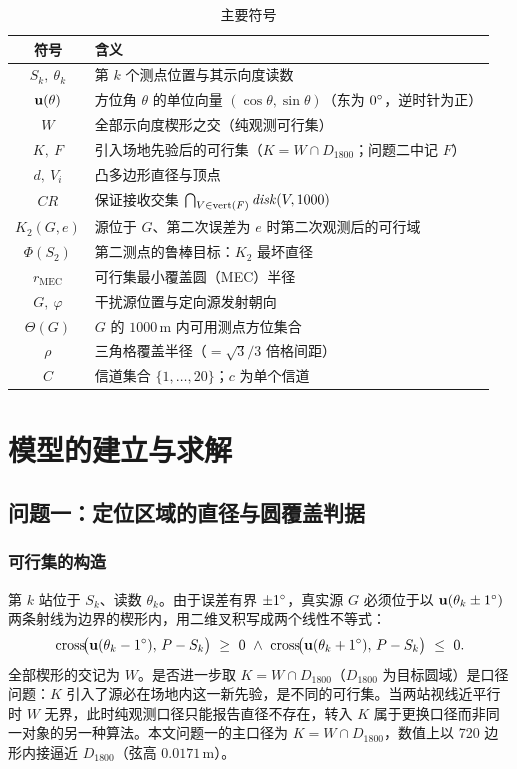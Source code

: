 \documentclass[12pt,a4paper]{ctexart}
\begin{document}
\begin{table}[H]
  \centering
  \caption{主要符号}
  \label{tab:symbols}
  \begin{tabular}{cl}
    \toprule
    \textbf{符号} & \textbf{含义} \\
    \midrule
    $S_k,\ \theta_k$ & 第 $k$ 个测点位置与其示向度读数 \\
    $\mathbf{u}(\theta)$ & 方位角 $\theta$ 的单位向量 $(\cos\theta,\sin\theta)$（东为 $0^{\circ}$，逆时针为正） \\
    $W$ & 全部示向度楔形之交（纯观测可行集） \\
    $K,\ F$ & 引入场地先验后的可行集（$K=W\cap D_{1800}$；问题二中记 $F$） \\
    $d,\ V_i$ & 凸多边形直径与顶点 \\
    $CR$ & 保证接收交集 $\bigcap_{V\in\operatorname{vert}(F)}\mathit{disk}(V,1000)$ \\
    $K_2(G,e)$ & 源位于 $G$、第二次误差为 $e$ 时第二次观测后的可行域 \\
    $\Phi(S_2)$ & 第二测点的鲁棒目标：$K_2$ 最坏直径 \\
    $r_{\mathrm{MEC}}$ & 可行集最小覆盖圆（MEC）半径 \\
    $G,\ \varphi$ & 干扰源位置与定向源发射朝向 \\
    $\Theta(G)$ & $G$ 的 $1000\,$m 内可用测点方位集合 \\
    $\rho$ & 三角格覆盖半径（$=\sqrt{3}/3$ 倍格间距） \\
    $C$ & 信道集合 $\{1,\dots,20\}$；$c$ 为单个信道 \\
    \bottomrule
  \end{tabular}
\end{table}

\section{模型的建立与求解}

\subsection{问题一：定位区域的直径与圆覆盖判据}

\subsubsection{可行集的构造}

第 $k$ 站位于 $S_k$、读数 $\theta_k$。由于误差有界 $\pm 1^{\circ}$，真实源 $G$ 必须位于以 $\mathbf{u}(\theta_k\pm 1^{\circ})$ 两条射线为边界的楔形内，用二维叉积写成两个线性不等式：
\begin{equation}
  \cross\!\bigl(\vect{u}(\theta_k-1\degr),\,P-S_k\bigr)\ \ge\ 0
  \ \wedge\
  \cross\!\bigl(\vect{u}(\theta_k+1\degr),\,P-S_k\bigr)\ \le\ 0 .
\end{equation}
全部楔形的交记为 $W$。是否进一步取 $K=W\cap D_{1800}$（$D_{1800}$ 为目标圆域）是口径问题：$K$ 引入了源必在场地内这一新先验，是不同的可行集。当两站视线近平行时 $W$ 无界，此时纯观测口径只能报告直径不存在，转入 $K$ 属于更换口径而非同一对象的另一种算法。本文问题一的主口径为 $K=W\cap D_{1800}$，数值上以 720 边形内接逼近 $D_{1800}$（弦高 $0.0171\,$m）。
\end{document}
